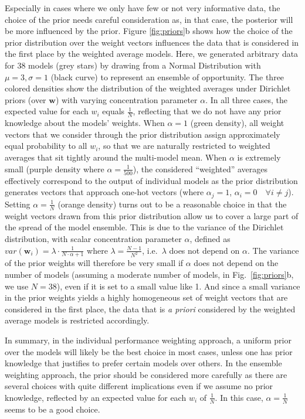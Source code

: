 Especially in cases where we only have few or not very informative data, the choice of the prior needs careful consideration as, in that case, the posterior will be more influenced by the prior. 
Figure \ref{fig:priors}b shows how the choice of the prior distribution over the weight vectors influences the data that is considered in the first place by the weighted average models. Here, we generated arbitrary data for 38 models (grey stars) by drawing from a Normal Distribution with $\mu=3, \sigma=1$ (black curve) to represent an ensemble of opportunity. 
The three colored densities show the distribution of the weighted averages under Dirichlet priors (over $\mathbf{w}$) with varying concentration parameter $\alpha$. In all three cases, the expected value for each $w_i$ equals $\frac{1}{N}$, reflecting that we do not have any prior knowledge about the models' weights. 
When $\alpha=1$ (green density), all weight vectors that we consider through the prior distribution assign approximately equal probability to all $w_i$, so that we are naturally restricted to weighted averages that sit tightly around the multi-model mean.
When $\alpha$ is extremely small (purple density where $\alpha=\frac{1}{500}$), the considered ``weighted'' averages effectively correspond to the output of individual models as the prior distribution generates vectors that approach one-hot vectors (where $\alpha_j=1$, $\alpha_i=0 \quad \forall i\neq j$).
Setting $\alpha = \frac{1}{N}$ (orange density) turns out to be a reasonable choice in that the weight vectors drawn from this prior distribution allow us to cover a large part of the spread of the model ensemble.
This is due to the variance of the Dirichlet distribution, with scalar concentration parameter $\alpha$, defined as $var(\mathbf{w}_i)=\lambda \cdot \frac{1}{N \cdot \alpha + 1}$ where $\lambda=\frac{N-1}{N^2}$, i.e.~$\lambda$ does not depend on $\alpha$.
The variance of the prior weights will therefore be very small if $\alpha$ does not depend on the number of models (assuming a moderate number of models, in Fig.~\ref{fig:priors}b, we use $N=38$), even if it is set to a small value like 1.
And since a small variance in the prior weights yields a highly homogeneous set of weight vectors that are considered in the first place, the data that is \emph{a priori} considered by the weighted average models is restricted accordingly.

In summary, in the individual performance weighting approach, a uniform prior over the models will likely be the best choice in most cases, unless one has prior knowledge that justifies to prefer certain models over others. In the ensemble weighting approach, the prior should be considered more carefully as there are several choices with quite different implications even if we assume no prior knowledge, reflected by an expected value for each $w_i$ of $\frac{1}{N}$. In this case, $\alpha = \frac{1}{N}$ seems to be a good choice. 

